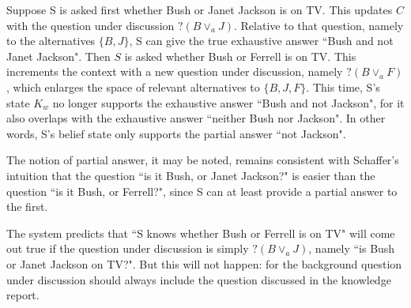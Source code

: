 Suppose S is asked first whether Bush or Janet Jackson is on TV.
This updates $C$ with the question under discussion $?(B\vee_a
J)$. Relative to that question, namely to the alternatives
$\{B,J\}$, S can give the true exhaustive answer ``Bush and not
Janet Jackson". Then $S$ is asked whether Bush or Ferrell is on
TV. This increments the context with a new question under
discussion, namely $?(B \vee_a F)$, which enlarges the space of
relevant alternatives to $\{B,J,F\}$. This time, S's state $K_w$
no longer supports the exhaustive answer ``Bush and not Jackson",
for it also overlaps with the exhaustive answer ``neither Bush nor
Jackson". In other words, S's belief state only supports the
partial answer ``not Jackson".

The notion of partial answer, it may be noted, remains consistent
with Schaffer's intuition that the question ``is it Bush, or Janet
Jackson?" is easier than the question ``is it Bush, or Ferrell?",
since S can at least provide a partial answer to the first.

The system predicts that ``S knows whether Bush or Ferrell is on
TV" will come out true if the question under discussion is simply
$?(B\vee_a J)$, namely ``is Bush or Janet Jackson on TV?". But
this will not happen: for the background question under discussion
should always include the question discussed in the knowledge
report.



 
